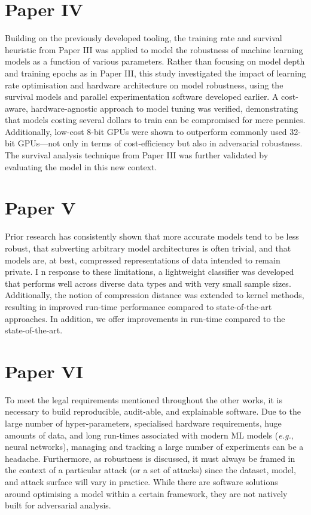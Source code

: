 \section{Paper IV}
\paperIV

Building on the previously developed tooling, the training rate and survival heuristic from Paper III was applied to model the robustness of machine learning models as a function of various parameters.
Rather than focusing on model depth and training epochs as in Paper III, this study investigated the impact of learning rate optimisation and hardware architecture on model robustness, using the survival models and parallel experimentation software developed earlier. 
A cost-aware, hardware-agnostic approach to model tuning was verified, demonstrating that models costing several dollars to train can be compromised for mere pennies. 
Additionally, low-cost 8-bit GPUs were shown to outperform commonly used 32-bit GPUs—not only in terms of cost-efficiency but also in adversarial robustness. 
The survival analysis technique from Paper III was further validated by evaluating the model in this new context.

\section{Paper V}
\paperV

\vspace{1em}
\noindent{}
Prior research has consistently shown that more accurate models tend to be less robust, that subverting arbitrary model architectures is often trivial, and that models are, at best, compressed representations of data intended to remain private. I
n response to these limitations, a lightweight classifier was developed that performs well across diverse data types and with very small sample sizes. 
Additionally, the notion of compression distance was extended to kernel methods, resulting in improved run-time performance compared to state-of-the-art approaches.
In addition, we offer improvements in run-time  compared to the state-of-the-art.

\section{Paper VI}
\paperVI

\vspace{1em}
\noindent{}
To meet the legal requirements mentioned throughout the other works, it is necessary to build reproducible, audit-able, and explainable software. 
Due to the large number of hyper-parameters, specialised hardware requirements, huge amounts of data, and long run-times associated with modern ML models (\textit{e.g.}, neural networks), managing and tracking a large number of experiments can be a headache. 
Furthermore, as robustness is discussed, it must always be framed in the context of a particular attack (or a set of attacks) since the dataset, model, and attack surface will vary in practice. 
While there are software solutions around optimising a model within a certain framework, they are not natively built for adversarial analysis. 

